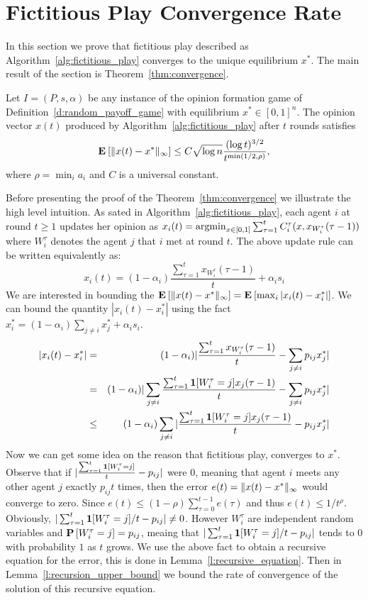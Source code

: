 \section{Fictitious Play Convergence Rate}\label{s:fictitious_convergence}
In this section we prove that fictitious play described as
Algorithm~\ref{alg:fictitious_play} converges to the unique equilibrium $x^*$.
The main result of the section is Theorem~\ref{thm:convergence}.

\begin{theorem}\label{thm:convergence}
  Let $I = (P,s, \alpha)$ be any instance of the opinion formation
  game of Definition~\ref{d:random_payoff_game} with equilibrium
  $x^* \in [0,1]^n$.  The opinion vector $x(t)$ produced by
  Algorithm~\ref{alg:fictitious_play} after $t$ rounds satisfies
  \[
    \bm{\mathrm{E}}_{} \left[ \| x(t) - x^* \|_{\infty} \right] \leq
    C \sqrt{\log n}\frac{(\log t)^{3/2}}{t^{\min(1/2,\rho)}},
  \]
  where $\rho = \min_i a_i$ and $C$ is a universal constant.
\end{theorem}
\noindent Before presenting the proof of the Theorem~\ref{thm:convergence} we
illustrate the high level intuition.
As sated in Algorithm~\ref{alg:fictitious_play}, each agent $i$ at round $t\geq 1$ updates her opinion 
as $x_i(t)=\operatorname*{argmin}_{x \in [0,1]}\sum_{\tau=1}^tC^{\tau}_i(x,x_{W_i^{\tau}}(\tau-1))$
where $W_i^\tau$ denotes the agent $j$ that $i$ met at round $t$. 
The above update rule can be written equivalently as: \[x_i(t)=(1-\alpha_i)\frac{\sum_{\tau=1}^{t} x_{W_i^\tau}(\tau-1)}{t}+ \alpha_i s_i\]
We are interested in bounding the $\bm{\mathrm{E}}_{} \left[ \| x(t)-x^* \|_{\infty} \right]=\bm{\mathrm{E}}_{} \left[ \max_{i}|x_i(t)-x_i^*| \right]$. 
We can bound the quantity $|x_i(t)-x_i^*|$ using the fact $x_i^*= (1-\alpha_i)\sum_{j \neq i}x_j^* + \alpha_is_i$.
\begin{eqnarray*}
 |x_i(t)-x_i^*| &=& (1-\alpha_i)|\frac{\sum_{\tau=1}^{t} x_{W_i^\tau}(\tau-1)}{t}-\sum_{j\neq i} p_{ij}x_j^*|\\
 &=& (1-\alpha_i)|\sum_{j\neq i}\frac{\sum_{\tau=1}^{t} \bm{1}{\left[W_i^\tau=j\right]}x_j(\tau-1)}{t}-\sum_{j\neq i} p_{ij}x_j^*|\\
 &\leq& (1-\alpha_i)\sum_{j\neq i}|\frac{\sum_{\tau=1}^{t} \bm{1}{\left[W_i^\tau=j\right]}x_j(\tau-1)}{t}- p_{ij}x_j^*|
\end{eqnarray*}
Now we can get some idea on the reason that fictitious play, converges to $x^*$. Observe that 
if $|\frac{\sum_{\tau=1}^{t} \bm{1}{\left[W_i^{\tau}=j\right]}}{t}- p_{ij}|$ were $0$, meaning that agent $i$
meets any other agent $j$ exactly $p_{ij}t$ times, then the error $e(t)=\| x(t)-x^* \|_{\infty}$
would converge to zero. Since $e(t) \leq (1-\rho)\sum_{\tau=0}^{t-1}e(\tau)$ and thus $e(t) \leq 1/t^\rho$. 
Obviously, $|\sum_{\tau=1}^{t} \bm{1}{\left[W_i^{\tau}=j\right]}/t - p_{ij}|\neq 0$. However $W_i^\tau$ are independent
random variables and $\bm{\mathrm{P}}\left[W_i^\tau = j\right]=p_{ij}$, meaing that $|\sum_{\tau=1}^{t} \bm{1}{\left[W_i^{\tau}=j\right]}/t - p_{ij}|$ 
tends to $0$ with probability $1$ as $t$ grows. We use the above fact to obtain a recursive equation 
for the error, this is done in Lemma~\ref{l:recursive_equation}. Then in Lemma~\ref{l:recursion_upper_bound} we bound
the rate of convergence of the solution of this recursive equation.

